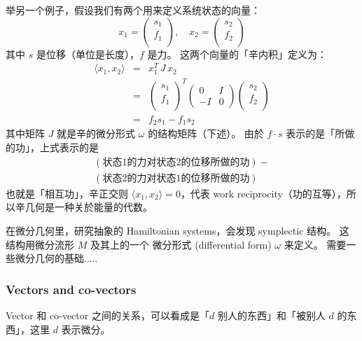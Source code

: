 \documentclass[orivec]{llncs}
\begin{document}
举另一个例子，假设我们有两个用来定义系统状态的向量：
\begin{equation}
x_1 = \left(
\begin{array}{c}
s_1\\
f_1\\
\end{array}
\right), \quad
x_2 = \left(
\begin{array}{c}
s_2\\
f_2\\
\end{array}
\right)
\end{equation}
其中 $s$ 是位移（单位是长度），$f$ 是力。 这两个向量的「辛内积」定义为：
\begin{eqnarray}
\langle x_1, x_2 \rangle & = & x_1^T \, J \, x_2 \nonumber \\
& = &
\left(
\begin{array}{c}
s_1\\
f_1\\
\end{array}
\right)^T
\left( \begin{array}{cc}
0  & I \\
-I & 0 \end{array} \right)
\left(
\begin{array}{c}
s_2\\
f_2\\
\end{array}
\right) \\
& = & f_2 s_1 - f_1 s_2 \nonumber
\end{eqnarray}
其中矩阵 $J$ 就是辛的微分形式 $\omega$ 的结构矩阵（下述）。 由於 $f \cdot s$ 表示的是「所做的功」，上式表示的是
\begin{multline}
(\mbox{状态1的力对状态2的位移所做的功}) - \\
(\mbox{状态2的力对状态1的位移所做的功})
\end{multline}
也就是「相互功」，辛正交则 $\langle x_1, x_2 \rangle = 0$，代表 work reciprocity（功的互等），所以辛几何是一种关於能量的代数。

在微分几何里，研究抽象的 Hamiltonian systems，会发现 symplectic 结构。 这结构用微分流形 $M$ 及其上的一个 微分形式 (differential form) $\omega$ 来定义。 需要一些微分几何的基础.....

\subsubsection{Vectors and co-vectors}

Vector 和 co-vector 之间的关系，可以看成是「$d$ 别人的东西」和「被别人 $d$ 的东西」，这里 $d$ 表示微分。
\end{document}
